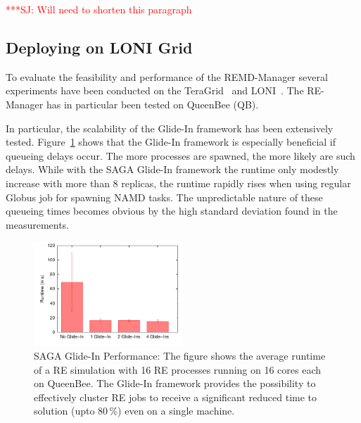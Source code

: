 \documentclass[conference,final]{IEEEtran}
\newcommand{\jhanote}[1]{ {\textcolor{red} { ***SJ: #1 }}}
\newcommand{\jhanote}[1]{}
\begin{document}
\jhanote{Will need to shorten this paragraph}

\subsection{Deploying on LONI Grid}

To evaluate the feasibility and performance of the REMD-Manager
several experiments have been conducted on the
TeraGrid~\cite{teragrid} and LONI~\cite{loni}.  The RE-Manager has in
particular been tested on QueenBee (QB).

In particular, the scalability of the Glide-In framework has been
extensively tested.  Figure~\ref{fig:perf_remd_glidin} shows that the
Glide-In framework is especially beneficial if queueing delays
occur. The more processes are spawned, the more likely are such
delays. While with the SAGA Glide-In framework the runtime only
modestly increase with more than 8 replicas, the runtime rapidly rises
when using regular Globus job for spawning NAMD tasks. The
unpredictable nature of these queueing times becomes obvious by the
high standard deviation found in the measurements.

\begin{figure}[htbp]
        \includegraphics[width=0.5\textwidth]{perf_glidein.pdf}
        \caption{SAGA Glide-In Performance: The figure shows the average runtime of a 
        RE simulation with 16 RE processes running on 16 cores each on QueenBee. 
        The Glide-In framework provides the possibility to effectively cluster
        RE jobs to receive a significant reduced time to solution (upto 80\,\%) 
        even on a single machine.}

    \label{fig:perf_remd_glidin}
\end{figure}
\end{document}
